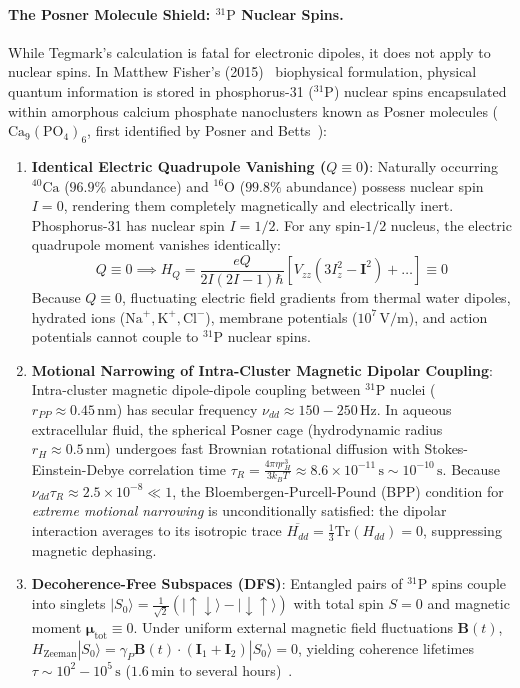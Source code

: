 \documentclass[10pt,twocolumn,3p]{article}
\begin{document}
\paragraph{The Posner Molecule Shield: $^{31}\text{P}$ Nuclear Spins.}
While Tegmark's calculation is fatal for electronic dipoles, it does not apply to nuclear spins. In Matthew Fisher's (2015)~\cite{fisher2015} biophysical formulation, physical quantum information is stored in phosphorus-31 ($^{31}\text{P}$) nuclear spins encapsulated within amorphous calcium phosphate nanoclusters known as Posner molecules ($\text{Ca}_9(\text{PO}_4)_6$, first identified by Posner and Betts~\cite{posner1975}):
\begin{enumerate}
    \item \textbf{Identical Electric Quadrupole Vanishing ($Q \equiv 0$)}: Naturally occurring $^{40}\text{Ca}$ ($96.9\%$ abundance) and $^{16}\text{O}$ ($99.8\%$ abundance) possess nuclear spin $I = 0$, rendering them completely magnetically and electrically inert. Phosphorus-31 has nuclear spin $I = 1/2$. For any spin-$1/2$ nucleus, the electric quadrupole moment vanishes identically:
    \begin{equation}
        Q \equiv 0 \implies H_Q = \frac{e Q}{2I(2I-1)\hbar} \left[ V_{zz} (3I_z^2 - \mathbf{I}^2) + \dots \right] \equiv 0
    \end{equation}
    Because $Q \equiv 0$, fluctuating electric field gradients from thermal water dipoles, hydrated ions ($\text{Na}^+, \text{K}^+, \text{Cl}^-$), membrane potentials ($10^7\,\text{V/m}$), and action potentials cannot couple to $^{31}\text{P}$ nuclear spins.
    \item \textbf{Motional Narrowing of Intra-Cluster Magnetic Dipolar Coupling}: Intra-cluster magnetic dipole-dipole coupling between $^{31}\text{P}$ nuclei ($r_{PP} \approx 0.45\,\text{nm}$) has secular frequency $\nu_{dd} \approx 150 - 250\,\text{Hz}$. In aqueous extracellular fluid, the spherical Posner cage (hydrodynamic radius $r_H \approx 0.5\,\text{nm}$) undergoes fast Brownian rotational diffusion with Stokes-Einstein-Debye correlation time $\tau_R = \frac{4\pi \eta r_H^3}{3 k_B T} \approx 8.6 \times 10^{-11}\,\text{s} \sim 10^{-10}\,\text{s}$. Because $\nu_{dd} \tau_R \approx 2.5 \times 10^{-8} \ll 1$, the Bloembergen-Purcell-Pound (BPP) condition for \textit{extreme motional narrowing} is unconditionally satisfied: the dipolar interaction averages to its isotropic trace $\overline{H_{dd}} = \frac{1}{3}\text{Tr}(H_{dd}) = 0$, suppressing magnetic dephasing.
    \item \textbf{Decoherence-Free Subspaces (DFS)}: Entangled pairs of $^{31}\text{P}$ spins couple into singlets $|S_0\rangle = \frac{1}{\sqrt{2}}(|\!\uparrow\downarrow\rangle - |\!\downarrow\uparrow\rangle)$ with total spin $S = 0$ and magnetic moment $\boldsymbol{\mu}_{\text{tot}} \equiv 0$. Under uniform external magnetic field fluctuations $\mathbf{B}(t)$, $H_{\text{Zeeman}}|S_0\rangle = \gamma_P \mathbf{B}(t) \cdot (\mathbf{I}_1 + \mathbf{I}_2)|S_0\rangle = 0$, yielding coherence lifetimes $\tau \sim 10^2 - 10^5\,\text{s}$ ($1.6\,\text{min}$ to several hours)~\cite{swift2018}.
\end{enumerate}
\end{document}

